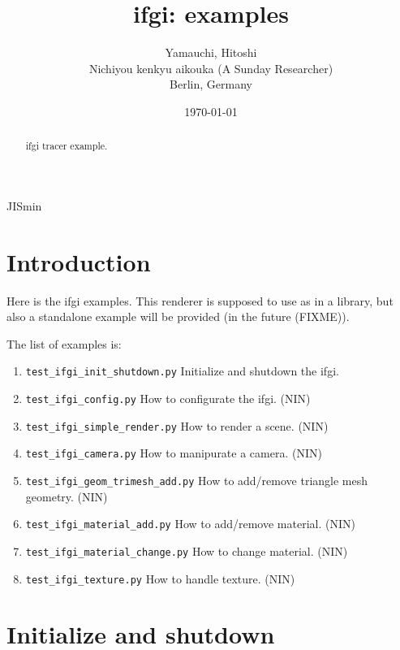 \documentclass[12pt]{scrartcl}\usepackage{CJK}
\title{ifgi: examples}
\date{\today}
\author{Yamauchi, Hitoshi\\
Nichiyou kenkyu aikouka (A Sunday Researcher)\\
Berlin, Germany}
\begin{document}
\begin{CJK*}[dnp]{JIS}{min}

\maketitle

\def\vec#1{\mbox{\boldmath {$#1$}} }

\begin{abstract}
ifgi tracer example.
\end{abstract}

\section{Introduction}

Here is the ifgi examples. This renderer is supposed to use as in a
library, but also a standalone example will be provided (in the future
(FIXME)).

The list of examples is:
\begin{enumerate}
 \item \verb|test_ifgi_init_shutdown.py| Initialize and shutdown the
 ifgi.

 \item \verb|test_ifgi_config.py|
       How to configurate the ifgi. (NIN)

 \item \verb|test_ifgi_simple_render.py|
       How to render a scene. (NIN)

 \item \verb|test_ifgi_camera.py|
       How to manipurate a camera. (NIN)

 \item \verb|test_ifgi_geom_trimesh_add.py|
       How to add/remove triangle mesh geometry. (NIN)

 \item \verb|test_ifgi_material_add.py|
       How to add/remove material. (NIN)

 \item \verb|test_ifgi_material_change.py|
       How to change material. (NIN)

 \item \verb|test_ifgi_texture.py|
       How to handle texture. (NIN)
\end{enumerate}


\section{Initialize and shutdown}


\end{CJK*}
\end{document}
